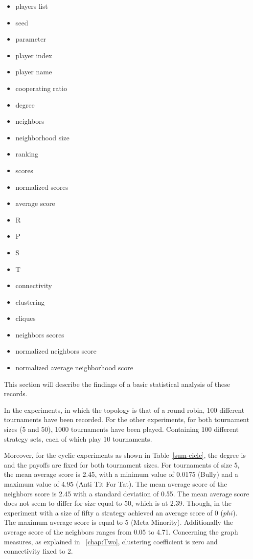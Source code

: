 \begin{multicols}{3}
	\begin{itemize}
		\item players list
		\item seed
		\item parameter
		\item player index
		\item player name
		\item cooperating ratio
		\item degree
		\item neighbors
		\item neighborhood size
		\item ranking
		\item scores
		\item normalized scores
		\item average score
		\item R
		\item P
		\item S
		\item T
		\item connectivity
		\item clustering
		\item cliques
		\item neighbors scores
		\item normalized neighbors score
		\item normalized average neighborhood score
	\end{itemize}
\end{multicols}

This section will describe the findings of a basic statistical analysis of these
records.

In the experiments, in which the topology is that of a round robin,
100 different tournaments have been recorded.
For the other experiments, for both tournament sizes (5 and 50),
1000 tournaments have been played. Containing 100 different strategy sets, each of
which play 10 tournaments.

Moreover, for the cyclic experiments as shown in Table~\ref{sum-cicle}, the degree is
and the payoffs are fixed for both tournament sizes. For tournaments of size 5,
the mean average score is 2.45, with a minimum value of 0.0175 (Bully) and a maximum
value of 4.95 (Anti Tit For Tat). The mean average score of the neighbors score
is 2.45 with a standard deviation of 0.55.
The mean average score does not seem to differ for size equal to 50, which is at
2.39. Though, in the experiment with a size of fifty a strategy
achieved an average score of 0 ($phi$). The maximum average score is equal to
5 (Meta Minority). Additionally the average score of the neighbors ranges
from 0.05 to 4.71. Concerning the graph measures, as explained in ~\autoref{chap:Two},
clustering coefficient is zero and connectivity fixed to 2.


